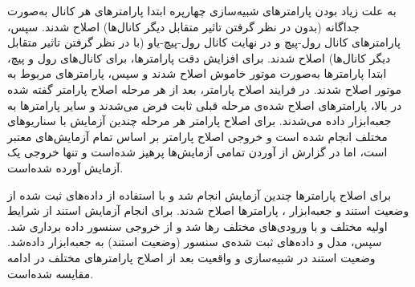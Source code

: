 به علت زیاد بودن پارامترهای شبیه‌سازی چهارپره ابتدا پارامترهای هر کانال به‌صورت جداگانه (بدون در نظر گرفتن تاثیر متقابل دیگر کانال‌‌ها) اصلاح شدند. سپس، پارامترهای کانال رول-پیچ و در نهایت کانال رول-پیچ-یاو  (با در نظر گرفتن تاثیر متقابل دیگر کانال‌‌ها) اصلاح شدند. برای افزایش دقت پارامترها، برای کانال‌های رول و پیچ، ابتدا پارامترها به‌صورت موتور خاموش اصلاح شدند و سپس، پارامترهای مربوط به موتور اصلاح شدند.
در فرایند اصلاح پارامتر، بعد از هر مرحله اصلاح پارامتر گفته شده در بالا،  پارامترهای اصلاح شده‌ی مرحله قبلی ثابت فرض می‌شدند و سایر پارامترها به جعبه‌ابزار
داده می‌شدند. برای اصلاح پارامتر هر مرحله چندین آزمایش با سناریوهای مختلف انجام شده است و خروجی اصلاح پارامتر بر اساس تمام آزمایش‌های معتبر است، اما در گزارش از آوردن تمامی آزمایش‌ها پرهیز شده‌است و تنها خروجی یک آزمایش آورده شده‌است.


برای اصلاح پارامترها چندین آزمایش انجام شد و با استفاده از داده‌های ثبت شده از وضعیت استند و جعبه‌ابزار
، پارامترها اصلاح شدند.
برای انجام آزمایش استند از شرایط اولیه مختلف و با ورودی‌های مختلف رها شد و از خروجی سنسور داده برداری شد. سپس، مدل و داده‌های ثبت شده‌ی سنسور (وضعیت استند) به جعبه‌ابزار
 داده‌شد. 
وضعیت استند در شبیه‌سازی و واقعیت بعد از اصلاح پارامترهای مختلف
در ادامه مقایسه شده‌است.






